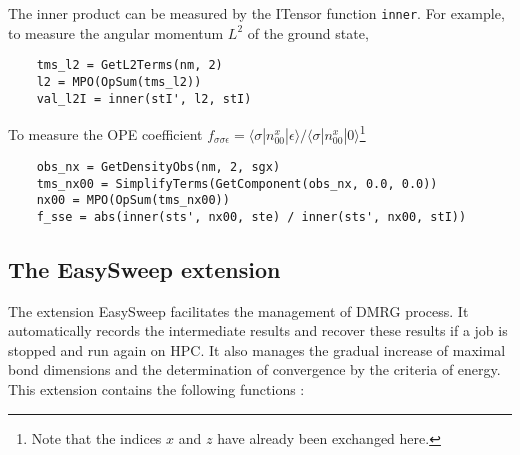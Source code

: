 \documentclass{timesjhep}
\begin{document}
The inner product can be measured by the ITensor function \lstinline|inner|. For example, to measure the angular momentum $L^2$ of the ground state,
\begin{lstlisting}
    tms_l2 = GetL2Terms(nm, 2)
    l2 = MPO(OpSum(tms_l2))
    val_l2I = inner(stI', l2, stI)
\end{lstlisting}
To measure the OPE coefficient $f_{\sigma\sigma\epsilon}=\langle \sigma|n^x_{00}|\epsilon\rangle/\langle \sigma|n^x_{00}|0\rangle$\footnote{Note that the indices $x$ and $z$ have already been exchanged here. }
\begin{lstlisting}
    obs_nx = GetDensityObs(nm, 2, sgx)
    tms_nx00 = SimplifyTerms(GetComponent(obs_nx, 0.0, 0.0))
    nx00 = MPO(OpSum(tms_nx00))
    f_sse = abs(inner(sts', nx00, ste) / inner(sts', nx00, stI))
\end{lstlisting}

\subsection{The EasySweep extension}

The extension EasySweep facilitates the management of DMRG process. It automatically records the intermediate results and recover these results if a job is stopped and run again on HPC. It also manages the gradual increase of maximal bond dimensions and the determination of convergence by the criteria of energy. This extension contains the following functions :
\end{document}
